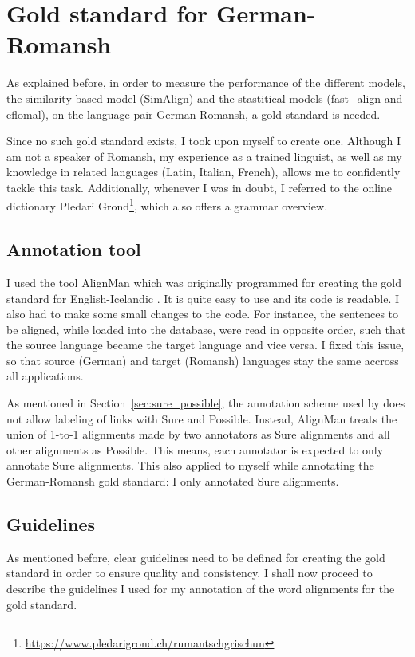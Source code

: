 \section{Gold standard for German-Romansh}
As explained before, in order to measure the performance of the different models, the similarity  based model (SimAlign) and the stastitical models (fast\_align and eflomal), on the language pair German-Romansh, a gold standard is needed. 

Since no such gold standard exists, I took upon myself to create one. 
Although I am not a speaker of Romansh, my experience as a trained linguist, as well as my knowledge in related languages (Latin, Italian, French), allows me to confidently tackle this task. 
Additionally, whenever I was in doubt, I referred to the online dictionary Pledari Grond\footnote{\url{https://www.pledarigrond.ch/rumantschgrischun}}, which also offers a grammar overview. 

\subsection{Annotation tool}
\label{sec:AlignMan}
I used the tool AlignMan which was originally programmed for creating the gold standard for English-Icelandic \autocite{steingrimsson-etal-2021-combalign}. 
It is quite easy to use and its code is readable. 
I also had to make some small changes to the code. 
For instance, the sentences to be aligned, while loaded into the database, were read in opposite order, such that the source language became the target language and vice versa. 
I fixed this issue, so that source (German) and target (Romansh) languages stay the same accross all applications.

As mentioned in Section~\ref{sec:sure_possible}, the annotation scheme used by \cite{steingrimsson-etal-2021-combalign} does not allow labeling of links with Sure and Possible. 
Instead, AlignMan treats the union of 1-to-1 alignments made by two annotators as Sure alignments and all other alignments as Possible. 
This means, each annotator is expected to only annotate Sure alignments. This also applied to myself while annotating the German-Romansh gold standard: I only annotated Sure alignments. 


\subsection{Guidelines}
As mentioned before, clear guidelines need to be defined for creating the gold standard in order to ensure quality and consistency. I shall now proceed to describe the guidelines I used for my annotation of the word alignments for the gold standard.

